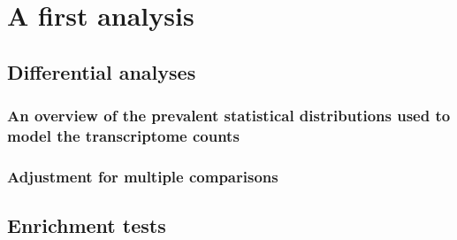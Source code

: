 \section{A first analysis}

\subsection{Differential analyses}

\subsubsection{An overview of the prevalent statistical distributions used to model the transcriptome counts}

\subsubsection{Adjustment for multiple comparisons}

\subsection{Enrichment tests}


